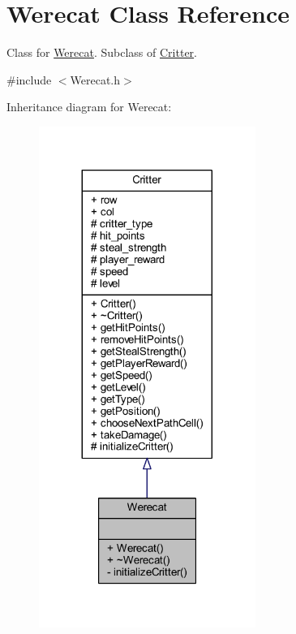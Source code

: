 \hypertarget{class_werecat}{\section{Werecat Class Reference}
\label{class_werecat}
}


Class for \hyperlink{class_werecat}{Werecat}. Subclass of \hyperlink{class_critter}{Critter}.  




{\ttfamily \#include $<$Werecat.\+h$>$}



Inheritance diagram for Werecat\+:
\nopagebreak
\begin{figure}[H]
\begin{center}
\leavevmode
\includegraphics[width=200pt]{class_werecat__inherit__graph}
\end{center}
\end{figure}


